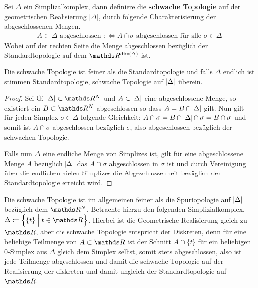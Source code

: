




\begin{Def}
	Sei $\Delta$ ein Simplizalkomplex, dann definiere die
	\textbf{schwache Topologie} auf der geometrischen Realisierung $| \Delta |$,
	durch folgende Charakterisierung der abgeschlossenen Mengen.
	\begin{gather*}
	A \subset \Delta \text{ abgeschlossen } :\Leftrightarrow A \cap
	\sigma \text{ abgeschlossen für alle } \sigma \in \Delta
	\end{gather*}
	Wobei auf der rechten Seite die Menge abgeschlossen bezüglich der
	Standardtopologie auf dem $\R^{\dim(\Delta)}$ ist.
\end{Def}

\begin{Lem}
	Die schwache Topologie ist feiner als die Standardtopologie und
	falls $\Delta$ endlich ist stimmen Standardtopologie, schwache
	Topologie auf $\left| \Delta \right|$ überein.
	\begin{proof}
		Sei \OE\; $\gr{\Delta} \subset \R^N$ und $A \subset \left| \Delta \right|$
		eine abgeschlossene Menge, so existiert ein $B \subset \R^N$
		abgeschlossen so dass $A = B \cap \left| \Delta \right|$ gilt. Nun gilt für
		jeden Simplex $\sigma \in \Delta$ folgende Gleichheit:
		$A \cap \sigma = B \cap \left| \Delta \right| \cap \sigma = B \cap \sigma$
		und somit ist $A \cap \sigma$ abgeschlossen bezüglich $\sigma$,
		also abgeschlossen bezüglich der schwachen Topologie.
		
		Falls nun $\Delta$ eine endliche Menge von Simplizes ist, gilt für
		eine abgeschlossene Menge $A$ bezüglich $\left| \Delta \right|$ das
		$A \cap \sigma$ abgeschlossen in $\sigma$ ist und durch
		Vereinigung über die endlichen vielen Simplizes die
		Abgeschlossenheit bezüglich der Standardtopologie erreicht wird.
	\end{proof}
\end{Lem}

\begin{Bem}
	Die schwache Topologie ist im allgemeinen feiner als die
	Spurtopologie auf $\left| \Delta \right|$ bezüglich dem $\R^N$. Betrachte
	hierzu den folgenden Simplizialkomplex,
	$\Delta \coloneqq \set{ \{t\} }{t \in \R}$.  Hierbei ist die
	Geometrische Realisierung gleich zu $\R$, aber die schwache
	Topologie entspricht der Diskreten, denn für eine beliebige
	Teilmenge von $A \subset \R$ ist der Schnitt $A \cap \{ t \}$ für
	ein beliebigen $0$-Simplex aus $\Delta$ gleich dem Simplex selbst,
	somit stets abgeschlossen, also ist jede Teilmenge abgeschlossen und
	damit die schwache Topologie auf der Realisierung der diskreten und
	damit ungleich der Standardtopologie auf $\R$.
\end{Bem}



